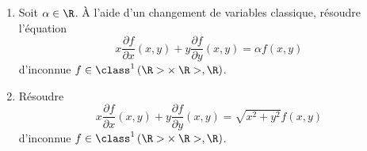 \begin{enonce}
\begin{exercise}[ID={RMS135 E965},subtitle={Mines-Ponts PSI 2024},tags={oraux},difficulty={}]
\begin{enumerate}
  \item Soit $\alpha\in\R$.
    À l'aide d'un changement de variables classique, résoudre l'équation
    \begin{equation*}
      x \frac{\partial f}{\partial x}(x,y) + y \frac{\partial f}{\partial y}(x,y) = \alpha f(x,y)
    \end{equation*}
    d'inconnue $f\in\class^1\left( {\R>}\times {\R>}, \R \right)$.

  \item 
    Résoudre
    \begin{equation*}
      x \frac{\partial f}{\partial x}(x,y) + y \frac{\partial f}{\partial y}(x,y) = \sqrt{x^2 + y^2} f(x,y)
    \end{equation*}
    d'inconnue $f\in\class^1\left( {\R>}\times {\R>}, \R \right)$.

\end{enumerate}
\end{exercise}
\begin{solution}
\end{solution}
\end{enonce}
